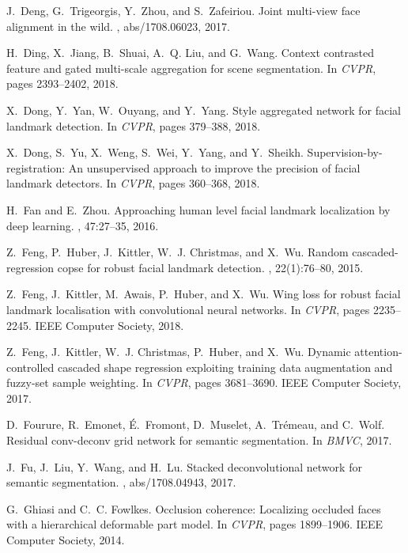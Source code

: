 \documentclass[10pt,twocolumn,letterpaper]{article}
\begin{document}
{\begin{thebibliography}{100}
J.~Deng, G.~Trigeorgis, Y.~Zhou, and S.~Zafeiriou.
\newblock Joint multi-view face alignment in the wild.
, abs/1708.06023, 2017.

H.~Ding, X.~Jiang, B.~Shuai, A.~Q. Liu, and G.~Wang.
\newblock Context contrasted feature and gated multi-scale aggregation for
  scene segmentation.
\newblock In {\em {CVPR}}, pages 2393--2402, 2018.

X.~Dong, Y.~Yan, W.~Ouyang, and Y.~Yang.
\newblock Style aggregated network for facial landmark detection.
\newblock In {\em {CVPR}}, pages 379--388, 2018.

X.~Dong, S.~Yu, X.~Weng, S.~Wei, Y.~Yang, and Y.~Sheikh.
\newblock Supervision-by-registration: An unsupervised approach to improve the
  precision of facial landmark detectors.
\newblock In {\em {CVPR}}, pages 360--368, 2018.

H.~Fan and E.~Zhou.
\newblock Approaching human level facial landmark localization by deep
  learning.
, 47:27--35, 2016.

Z.~Feng, P.~Huber, J.~Kittler, W.~J. Christmas, and X.~Wu.
\newblock Random cascaded-regression copse for robust facial landmark
  detection.
, 22(1):76--80, 2015.

Z.~Feng, J.~Kittler, M.~Awais, P.~Huber, and X.~Wu.
\newblock Wing loss for robust facial landmark localisation with convolutional
  neural networks.
\newblock In {\em {CVPR}}, pages 2235--2245. {IEEE} Computer Society, 2018.

Z.~Feng, J.~Kittler, W.~J. Christmas, P.~Huber, and X.~Wu.
\newblock Dynamic attention-controlled cascaded shape regression exploiting
  training data augmentation and fuzzy-set sample weighting.
\newblock In {\em {CVPR}}, pages 3681--3690. {IEEE} Computer Society, 2017.

D.~Fourure, R.~Emonet, {\'{E}}.~Fromont, D.~Muselet, A.~Tr{\'{e}}meau, and
  C.~Wolf.
\newblock Residual conv-deconv grid network for semantic segmentation.
\newblock In {\em {BMVC}}, 2017.

J.~Fu, J.~Liu, Y.~Wang, and H.~Lu.
\newblock Stacked deconvolutional network for semantic segmentation.
, abs/1708.04943, 2017.

G.~Ghiasi and C.~C. Fowlkes.
\newblock Occlusion coherence: Localizing occluded faces with a hierarchical
  deformable part model.
\newblock In {\em {CVPR}}, pages 1899--1906. {IEEE} Computer Society, 2014.


\end{thebibliography}}
\end{document}
